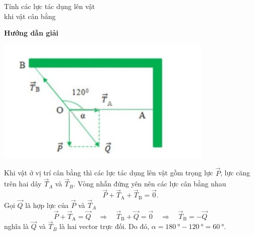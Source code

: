 \begin{dang}{Tính các lực tác dụng lên vật \\khi vật cân bằng}
	{	\begin{center}
			\textbf{Hướng dẫn giải}
		\end{center}
		
		\begin{center}
			\includegraphics[scale=0.8]{../figs/VN10-PH-11-L-008-4-V2-02.jpg}
		\end{center}
		Khi vật ở vị trí cân bằng thì các lực tác dụng lên vật gồm trọng lực $\vec{P}$, lực căng trên hai dây $\vec{T}_A$ và $\vec{T}_B$. Vòng nhẫn đứng yên nên các lực cân bằng nhau
		$$\vec{P}+\vec{T}_\textrm{A}+\vec{T}_\textrm{B}=\vec{0}.$$
		Gọi $\vec{Q}$ là hợp lực của $\vec{P}$ và $\vec{T}_A$
		$$\vec{P}+\vec{T}_\textrm{A}=\vec{Q}\quad\Rightarrow \quad\vec{T}_\textrm{B}+\vec{Q}=\vec{0}\quad\Rightarrow\quad \vec{T}_\textrm{B}=-\vec{Q}$$
		nghĩa là $\vec{Q}$ và $\vec{T}_B$ là hai vector trực đối. Do đó, $\alpha =\SI{	180}{\degree}-\SI{120}{\degree}=\SI{60}{\degree}.$
		
}
\end{dang}
